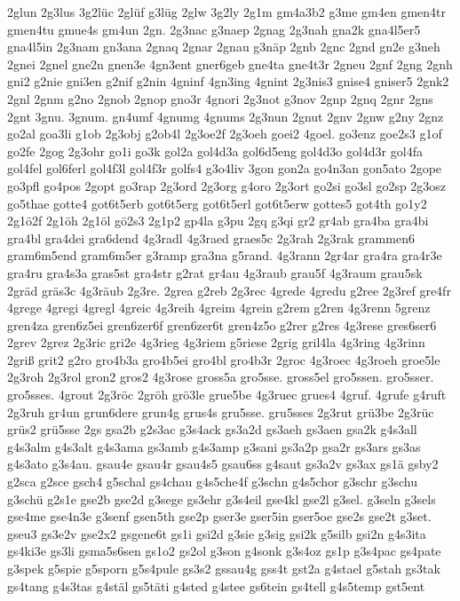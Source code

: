 {2glun
2g3lus
3g2lüc
2glüf
g3lüg
2glw
3g2ly
2g1m
gm4a3b2
g3me
gm4en
gmen4tr
gmen4tu
gmue4s
gm4un
2gn.
2g3nac
g3naep
2gnag
2g3nah
gna2k
gna4l5er5
gna4l5in
2g3nam
gn3ana
2gnaq
2gnar
2gnau
g3näp
2gnb
2gnc
2gnd
gn2e
g3neh
2gnei
2gnel
gne2n
gnen3e
4gn3ent
gner6geb
gne4ta
gne4t3r
2gneu
2gnf
2gng
2gnh
gni2
g2nie
gni3en
g2nif
g2nin
4gninf
4gn3ing
4gnint
2g3nis3
gnise4
gniser5
2gnk2
2gnl
2gnm
g2no
2gnob
2gnop
gno3r
4gnori
2g3not
g3nov
2gnp
2gnq
2gnr
2gns
2gnt
3gnu.
3gnum.
gn4umf
4gnumg
4gnums
2g3nun
2gnut
2gnv
2gnw
g2ny
2gnz
go2al
goa3li
g1ob
2g3obj
g2ob4l
2g3oe2f
2g3oeh
goei2
4goel.
go3enz
goe2s3
g1of
go2fe
2gog
2g3ohr
go1i
go3k
gol2a
gol4d3a
gol6d5eng
gol4d3o
gol4d3r
gol4fa
gol4fel
gol6ferl
gol4f3l
gol4f3r
golfs4
g3o4liv
3gon
gon2a
go4n3an
gon5ato
2gope
go3pfl
go4pos
2gopt
go3rap
2g3ord
2g3org
g4oro
2g3ort
go2si
go3sl
go2sp
2g3osz
go5thae
gotte4
got6t5erb
got6t5erg
got6t5erl
got6t5erw
gottes5
got4th
go1y2
2g1ö2f
2g1öh
2g1öl
gö2s3
2g1p2
gp4la
g3pu
2gq
g3qi
gr2
gr4ab
gra4ba
gra4bi
gra4bl
gra4dei
gra6dend
4g3radl
4g3raed
graes5c
2g3rah
2g3rak
grammen6
gram6m5end
gram6m5er
g3ramp
gra3na
g5rand.
4g3rann
2gr4ar
gra4ra
gra4r3e
gra4ru
gra4s3a
gras5st
gra4str
g2rat
gr4au
4g3raub
grau5f
4g3raum
grau5sk
2gräd
gräs3c
4g3räub
2g3re.
2grea
g2reb
2g3rec
4grede
4gredu
g2ree
2g3ref
gre4fr
4grege
4gregi
4gregl
4greic
4g3reih
4greim
4grein
g2rem
g2ren
4g3renn
5grenz
gren4za
gren6z5ei
gren6zer6f
gren6zer6t
gren4z5o
g2rer
g2res
4g3rese
gres6ser6
2grev
2grez
2g3ric
gri2e
4g3rieg
4g3riem
g5riese
2grig
gril4la
4g3ring
4g3rinn
2griß
grit2
g2ro
gro4b3a
gro4b5ei
gro4bl
gro4b3r
2groc
4g3roec
4g3roeh
groe5le
2g3roh
2g3rol
gron2
gros2
4g3rose
gross5a
gro5sse.
gross5el
gro5ssen.
gro5sser.
gro5sses.
4grout
2g3röc
2gröh
grö3le
grue5be
4g3ruec
grues4
4gruf.
4grufe
g4ruft
2g3ruh
gr4un
grun6dere
grun4g
grus4s
gru5sse.
gru5sses
2g3rut
grü3be
2g3rüc
grüs2
grü5sse
2gs
gsa2b
g2s3ac
g3s4ack
gs3a2d
gs3aeh
gs3aen
gsa2k
g4s3all
g4s3alm
g4s3alt
g4s3ama
gs3amb
g4s3amp
g3sani
gs3a2p
gsa2r
gs3ars
gs3as
g4s3ato
g3s4au.
gsau4e
gsau4r
gsau4s5
gsau6ss
g4saut
gs3a2v
gs3ax
gs1ä
gsby2
g2sca
g2sce
gsch4
g5schal
gs4chau
g4s5che4f
g3schn
g4s5chor
g3schr
g3schu
g3schü
g2s1e
gse2b
gse2d
g3sege
gs3ehr
g3s4eil
gse4kl
gse2l
g3sel.
g3seln
g3sels
gse4me
gse4n3e
g3senf
gsen5th
gse2p
gser3e
gser5in
gser5oe
gse2s
gse2t
g3set.
gseu3
gs3e2v
gse2x2
gsgene6t
gs1i
gsi2d
g3sie
g3sig
gsi2k
g5silb
gsi2n
g4s3ita
gs4ki3e
gs3li
gsma5s6sen
gs1o2
gs2ol
g3son
g4sonk
g3s4oz
gs1p
g3s4pac
gs4pate
g3spek
g5spie
g5sporn
g5s4pule
gs3s2
gssau4g
gss4t
gst2a
g4stael
g5stah
gs3tak
gs4tang
g4s3tas
g4stäl
gs5täti
g4sted
g4stee
gs6tein
gs4tell
g4s5temp
gst5ent
}
